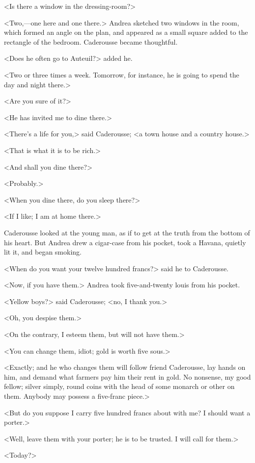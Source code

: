  <Is there a window in the dressing-room?> 

 <Two,—one here and one there.> Andrea sketched two windows in the room, which formed an angle on the plan, and appeared as a small square added to the rectangle of the bedroom. Caderousse became thoughtful. 

 <Does he often go to Auteuil?> added he. 

 <Two or three times a week. Tomorrow, for instance, he is going to spend the day and night there.> 

 <Are you sure of it?> 

 <He has invited me to dine there.> 

 <There's a life for you,> said Caderousse; <a town house and a country house.> 

 <That is what it is to be rich.> 

 <And shall you dine there?> 

 <Probably.> 

 <When you dine there, do you sleep there?> 

 <If I like; I am at home there.> 

 Caderousse looked at the young man, as if to get at the truth from the bottom of his heart. But Andrea drew a cigar-case from his pocket, took a Havana, quietly lit it, and began smoking. 

 <When do you want your twelve hundred francs?> said he to Caderousse. 

 <Now, if you have them.> Andrea took five-and-twenty louis from his pocket. 

 <Yellow boys?> said Caderousse; <no, I thank you.> 

 <Oh, you despise them.> 

 <On the contrary, I esteem them, but will not have them.> 

 <You can change them, idiot; gold is worth five sous.> 

 <Exactly; and he who changes them will follow friend Caderousse, lay hands on him, and demand what farmers pay him their rent in gold. No nonsense, my good fellow; silver simply, round coins with the head of some monarch or other on them. Anybody may possess a five-franc piece.> 

 <But do you suppose I carry five hundred francs about with me? I should want a porter.> 

 <Well, leave them with your porter; he is to be trusted. I will call for them.> 

 <Today?> 


